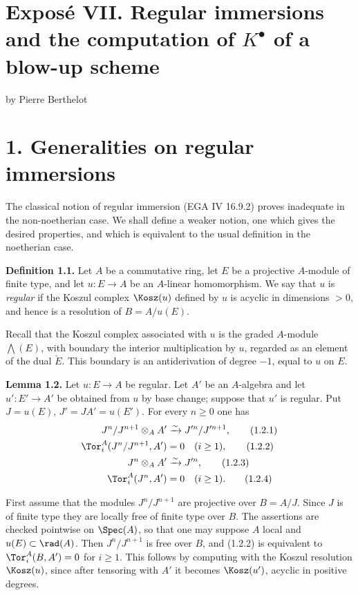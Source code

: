 \section*{Exposé VII. Regular immersions and the computation of \texorpdfstring{$K^\bullet$}{K} of a blow-up scheme}
\begin{center}
by Pierre Berthelot
\end{center}

\section*{1. Generalities on regular immersions}

The classical notion of regular immersion (EGA IV 16.9.2) proves inadequate in the non-noetherian case. We shall define a weaker notion, one which gives the desired properties, and which is equivalent to the usual definition in the noetherian case.

\textbf{Definition 1.1.} Let \(A\) be a commutative ring, let \(E\) be a projective \(A\)-module of finite type, and let \(u:E\to A\) be an \(A\)-linear homomorphism. We say that \(u\) is \emph{regular} if the Koszul complex \(\Kosz(u)\) defined by \(u\) is acyclic in dimensions \(>0\), and hence is a resolution of \(B=A/u(E)\).

Recall that the Koszul complex associated with \(u\) is the graded \(A\)-module \(\bigwedge(E)\), with boundary the interior multiplication by \(u\), regarded as an element of the dual \(\check E\). This boundary is an antiderivation of degree \(-1\), equal to \(u\) on \(E\).

\textbf{Lemma 1.2.} Let \(u:E\to A\) be regular. Let \(A'\) be an \(A\)-algebra and let \(u':E'\to A'\) be obtained from \(u\) by base change; suppose that \(u'\) is regular. Put \(J=u(E)\), \(J'=JA'=u(E')\). For every \(n\ge0\) one has
\begin{align}
 J^n/J^{n+1}\otimes_AA'&\xrightarrow{\sim}J'^n/J'^{n+1}, \tag{1.2.1}\\
 \Tor_i^A(J^n/J^{n+1},A')&=0\quad(i\ge1), \tag{1.2.2}\\
 J^n\otimes_AA'&\xrightarrow{\sim}J'^n, \tag{1.2.3}\\
 \Tor_i^A(J^n,A')&=0\quad(i\ge1). \tag{1.2.4}
\end{align}

First assume that the modules \(J^n/J^{n+1}\) are projective over \(B=A/J\). Since \(J\) is of finite type they are locally free of finite type over \(B\). The assertions are checked pointwise on \(\Spec(A)\), so that one may suppose \(A\) local and \(u(E)\subset\rad(A)\). Then \(J^n/J^{n+1}\) is free over \(B\), and (1.2.2) is equivalent to \(\Tor_i^A(B,A')=0\) for \(i\ge1\). This follows by computing with the Koszul resolution \(\Kosz(u)\), since after tensoring with \(A'\) it becomes \(\Kosz(u')\), acyclic in positive degrees.

